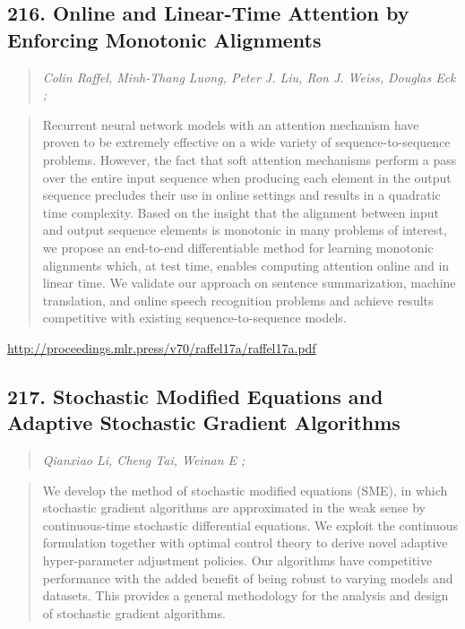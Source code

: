 \documentclass{article}
\begin{document}
\subsection{216. Online and Linear-Time Attention by Enforcing Monotonic Alignments}

\begin{quote}
\footnotesize{\textit{Colin Raffel, Minh-Thang Luong, Peter J. Liu, Ron J. Weiss, Douglas Eck ;}}

\end{quote}

\begin{quote}
    Recurrent neural network models with an attention mechanism have proven to be extremely effective on a wide variety of sequence-to-sequence problems. However, the fact that soft attention mechanisms perform a pass over the entire input sequence when producing each element in the output sequence precludes their use in online settings and results in a quadratic time complexity. Based on the insight that the alignment between input and output sequence elements is monotonic in many problems of interest, we propose an end-to-end differentiable method for learning monotonic alignments which, at test time, enables computing attention online and in linear time. We validate our approach on sentence summarization, machine translation, and online speech recognition problems and achieve results competitive with existing sequence-to-sequence models.  
\end{quote}

\href{http://proceedings.mlr.press/v70/raffel17a/raffel17a.pdf}{http://proceedings.mlr.press/v70/raffel17a/raffel17a.pdf}

\subsection{217. Stochastic Modified Equations and Adaptive Stochastic Gradient Algorithms}

\begin{quote}
\footnotesize{\textit{Qianxiao Li, Cheng Tai, Weinan E ;}}

\end{quote}

\begin{quote}
    We develop the method of stochastic modified equations (SME), in which stochastic gradient algorithms are approximated in the weak sense by continuous-time stochastic differential equations. We exploit the continuous formulation together with optimal control theory to derive novel adaptive hyper-parameter adjustment policies. Our algorithms have competitive performance with the added benefit of being robust to varying models and datasets. This provides a general methodology for the analysis and design of stochastic gradient algorithms.  
\end{quote}
\end{document}
